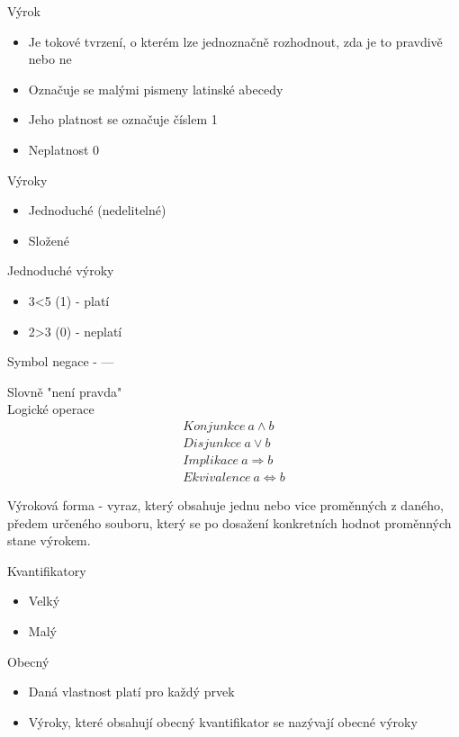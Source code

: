\documentclass[a4paper,12pt]{article}
\begin{document}
Výrok
\begin{itemize}
	\item Je tokové tvrzení, o kterém lze jednoznačně rozhodnout, zda je to pravdivě nebo ne
	\item Označuje se malými pismeny latinské abecedy
	\item Jeho platnost se označuje číslem 1
	\item Neplatnost 0 \\
\end{itemize}

Výroky
\begin{itemize}
	\item Jednoduché (nedelitelné)
	\item Složené \\
\end{itemize}

Jednoduché výroky
\begin{itemize}
	\item 3<5 (1) - platí
	\item 2>3 (0) - neplatí \\
\end{itemize}

Symbol negace - —

Slovně "není pravda" \\

Logické operace
\begin{align*}
Konjunkce~a \wedge b \\
Disjunkce~a \vee b \\
Implikace~a \Rightarrow b \\
Ekvivalence~ a \Leftrightarrow	b
\end{align*}

Výroková forma - vyraz, který obsahuje jednu nebo vice proměnných z 
daného, předem určeného souboru, který se po dosažení 
konkretních hodnot proměnných stane výrokem.

\newpage
Kvantifikatory
\begin{itemize}
	\item Velký
	\item Malý \\
\end{itemize}

Obecný
\begin{itemize}
	\item Daná vlastnost platí pro každý prvek
	\item Výroky, které obsahují obecný kvantifikator se nazývají obecné výroky \\
\end{itemize}
\end{document}
